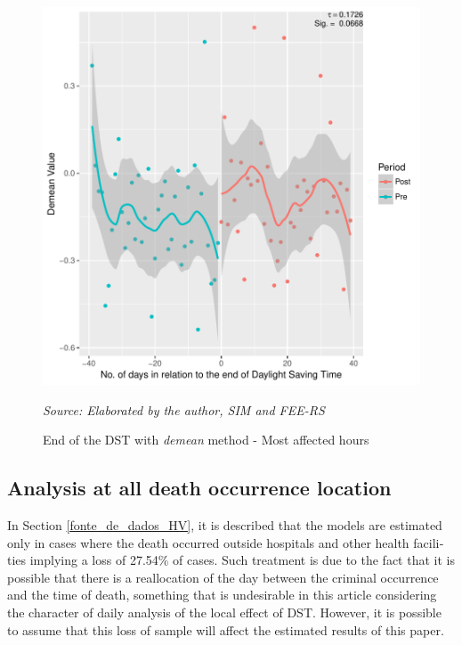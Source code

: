 \documentclass[12pt,openright,oneside,a4paper,english,french,spanish]{abntex2}
\numberwithin{table}{section} %
\numberwithin{figure}{section} %
\newcommand{\source}[1]{\textit{#1}}
\begin{document}
\begin{otherlanguage}{english}
\begin{figure}[H]
\begin{center}
\includegraphics{TESE_DE_DOUTORADO_RENAN_FINAL-plot_saida_demean_pelo_GAM_horas_mais_afetadas}
\end{center}
\caption{End of the DST with \textit{demean} method - Most affected hours}
\source{Source: Elaborated by the author, SIM and FEE-RS}
\label{fig:saida_HV_demean_horas_mais_afetadas}
\end{figure}


\subsection{Analysis at all death occurrence location\label{robustez_todos_casos}}

In Section \ref{fonte_de_dados_HV}, it is described that the models are estimated only in cases where the death occurred outside hospitals and other health facilities implying a loss of 27.54\% of cases. Such treatment is due to the fact that it is possible that there is a reallocation of the day between the criminal occurrence and the time of death, something that is undesirable in this article considering the character of daily analysis of the local effect of DST. However, it is possible to assume that this loss of sample will affect the estimated results of this paper.


\end{otherlanguage}
\end{document}
